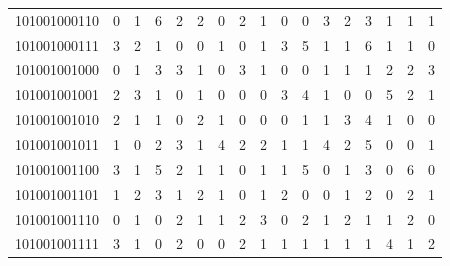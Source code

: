 \documentclass[10pt,a4paper]{article}
\begin{document}
\begin{longtable}{ |c|c|c|c|c|c|c|c|c|c|c|c|c|c|c|c|c| }
    101001000110              & 0                            & 1                                & 6                            & 2                              & 2   & 0   & 2   & 1   & 0   & 0   & 3   & 2   & 3   & 1   & 1   & 1   \\
    101001000111              & 3                            & 2                                & 1                            & 0                              & 0   & 1   & 0   & 1   & 3   & 5   & 1   & 1   & 6   & 1   & 1   & 0   \\
    101001001000              & 0                            & 1                                & 3                            & 3                              & 1   & 0   & 3   & 1   & 0   & 0   & 1   & 1   & 1   & 2   & 2   & 3   \\
    101001001001              & 2                            & 3                                & 1                            & 0                              & 1   & 0   & 0   & 0   & 3   & 4   & 1   & 0   & 0   & 5   & 2   & 1   \\
    101001001010              & 2                            & 1                                & 1                            & 0                              & 2   & 1   & 0   & 0   & 0   & 1   & 1   & 3   & 4   & 1   & 0   & 0   \\
    101001001011              & 1                            & 0                                & 2                            & 3                              & 1   & 4   & 2   & 2   & 1   & 1   & 4   & 2   & 5   & 0   & 0   & 1   \\
    101001001100              & 3                            & 1                                & 5                            & 2                              & 1   & 1   & 0   & 1   & 1   & 5   & 0   & 1   & 3   & 0   & 6   & 0   \\
    101001001101              & 1                            & 2                                & 3                            & 1                              & 2   & 1   & 0   & 1   & 2   & 0   & 0   & 1   & 2   & 0   & 2   & 1   \\
    101001001110              & 0                            & 1                                & 0                            & 2                              & 1   & 1   & 2   & 3   & 0   & 2   & 1   & 2   & 1   & 1   & 2   & 0   \\
    101001001111              & 3                            & 1                                & 0                            & 2                              & 0   & 0   & 2   & 1   & 1   & 1   & 1   & 1   & 1   & 4   & 1   & 2   \\

\end{longtable}
\end{document}
